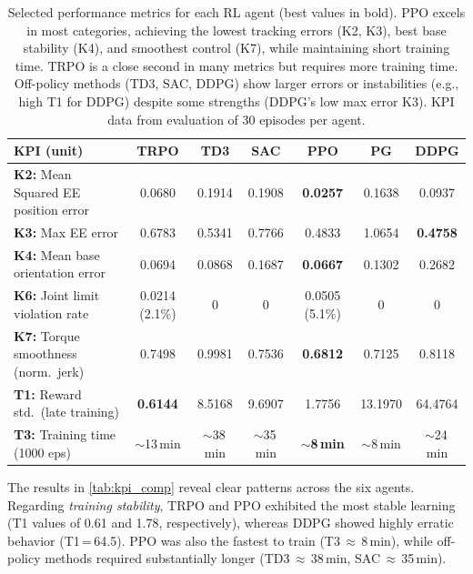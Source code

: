 \documentclass{ieeeaccess}
\begin{document}
\begin{table}[!t]
\centering
\caption{Selected performance metrics for each RL agent (best values in bold). PPO excels in most
categories, achieving the lowest tracking errors (K2, K3), best base stability (K4), and smoothest control
(K7), while maintaining short training time. TRPO is a close second in many metrics but requires more
training time. Off-policy methods (TD3, SAC, DDPG) show larger errors or instabilities (e.g., high T1 for 
DDPG) despite some strengths (DDPG's low max error K3). KPI data from evaluation of 30 episodes per agent.}
\label{tab:kpi_comp}
\renewcommand{\arraystretch}{1.3}
\setlength{\tabcolsep}{8pt}
\begin{tabular}{lcccccc}
\toprule
\textbf{KPI (unit)} & \textbf{TRPO} & \textbf{TD3} & \textbf{SAC} & \textbf{PPO} & \textbf{PG} & \textbf{DDPG} \\
\midrule
\textbf{K2:} Mean Squared EE position error &
0.0680 & 0.1914 & 0.1908 & \textbf{0.0257} & 0.1638 & 0.0937 \\
\textbf{K3:} Max EE error &
0.6783 & 0.5341 & 0.7766 & 0.4833 & 1.0654 & \textbf{0.4758} \\
\textbf{K4:} Mean base orientation error &
0.0694 & 0.0868 & 0.1687 & \textbf{0.0667} & 0.1302 & 0.2682 \\
\textbf{K6:} Joint limit violation rate &
0.0214 (2.1\%) & 0 & 0 & 0.0505 (5.1\%) & 0 & 0 \\
\textbf{K7:} Torque smoothness (norm.\ jerk) &
0.7498 & 0.9981 & 0.7536 & \textbf{0.6812} & 0.7125 & 0.8118 \\
\textbf{T1:} Reward std.\ (late training) &
\textbf{0.6144} & 8.5168 & 9.6907 & 1.7756 & 13.1970 & 64.4764 \\
\textbf{T3:} Training time (1000 eps) &
$\sim$13\,min & $\sim$38\,min & $\sim$35\,min & \textbf{$\sim$8\,min} & $\sim$8\,min & $\sim$24\,min \\
\bottomrule
\end{tabular}
\end{table}

\noindent
The results in \autoref{tab:kpi_comp} reveal clear patterns across the six agents. Regarding \emph{training stability}, 
TRPO and PPO exhibited the most stable learning (T1 values of 0.61 and 1.78, respectively), whereas DDPG showed highly 
erratic behavior (T1\,=\,64.5). PPO was also the fastest to train (T3\,$\approx$\,8\,min), while off-policy 
methods required substantially longer (TD3\,$\approx$\,38\,min, SAC\,$\approx$\,35\,min).
\end{document}
